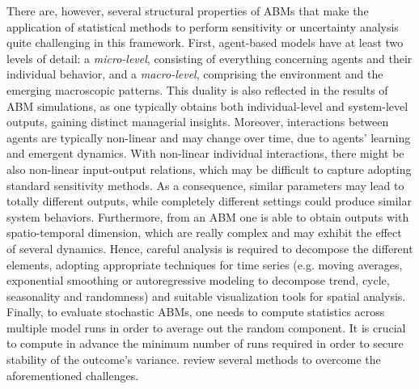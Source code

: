 There are, however, several structural properties of ABMs that make the application of statistical methods to perform sensitivity or uncertainty analysis quite challenging in this framework. First, agent-based models have at least two levels of detail: a \textit{micro-level}, consisting of everything concerning agents and their individual behavior, and a \textit{macro-level}, comprising the environment and the emerging macroscopic patterns. This duality is also reflected in the results of ABM simulations, as one typically obtains both individual-level and system-level outputs, gaining distinct managerial insights. Moreover, interactions between agents are typically non-linear and may change over time, due to agents' learning and emergent dynamics. With non-linear individual interactions, there might be also non-linear input-output relations, which may be difficult to capture adopting standard sensitivity methods. As a consequence, similar parameters may lead to totally different outputs, while completely different settings could produce similar system behaviors. Furthermore, from an ABM one is able to obtain outputs with spatio-temporal dimension, which are really complex and may exhibit the effect of several dynamics. Hence, careful analysis is required to decompose the different elements, adopting appropriate techniques for time series (e.g. moving averages, exponential smoothing or autoregressive modeling to decompose trend, cycle, seasonality and randomness) and suitable visualization tools for spatial analysis. Finally, to evaluate stochastic ABMs, one needs to compute statistics across multiple model runs in order to average out the random component. It is crucial to compute in advance the minimum number of runs required in order to secure stability of the outcome's variance. \textcite{Lee2015TheCO} review several methods to overcome the aforementioned challenges. 

